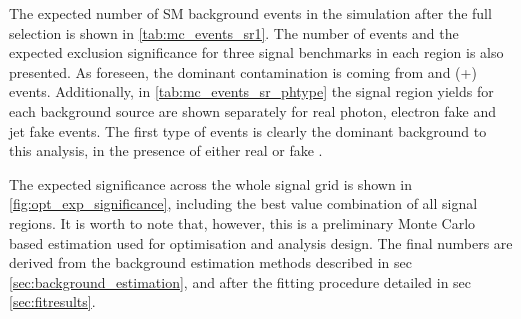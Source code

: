 The expected number of SM background events in the simulation after the full selection is shown in {\tab} \ref{tab:mc_events_sr1}.
The number of events and the expected exclusion significance for three signal benchmarks in each region is also presented. As
foreseen, the dominant contamination is coming from {\wgam} and \ttbar(+\gam) events.  Additionally, in {\tab} \ref{tab:mc_events_sr_phtype}
the signal region yields for each background source are shown separately for real photon, electron fake and jet fake events.
The first type of events is clearly the dominant background to this analysis, in the presence of either real or fake \met.

The expected significance across the whole signal grid is shown in {\fig} \ref{fig:opt_exp_significance}, including the best value
combination of all signal regions. It is worth to note that, however, this is a preliminary Monte Carlo based estimation used for
optimisation and analysis design. The final numbers are derived from the background estimation methods described in sec \ref{sec:background_estimation},
and after the fitting procedure detailed in sec \ref{sec:fitresults}.

